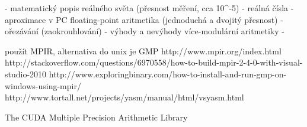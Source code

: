 - matematický popis reálného světa (přesnost měření, cca 10^-5) - reálná čísla
- aproximace v PC floating-point aritmetika (jednoduchá a dvojitý přesnost) - ořezávání (zaokrouhlování)
- výhody a nevýhody více-modulární aritmetiky
- 

použít MPIR, alternativa do unix je GMP
http://www.mpir.org/index.html
http://stackoverflow.com/questions/6970558/how-to-build-mpir-2-4-0-with-visual-studio-2010
http://www.exploringbinary.com/how-to-install-and-run-gmp-on-windows-using-mpir/
http://www.tortall.net/projects/yasm/manual/html/vsyasm.html

The CUDA Multiple Precision Arithmetic Library
